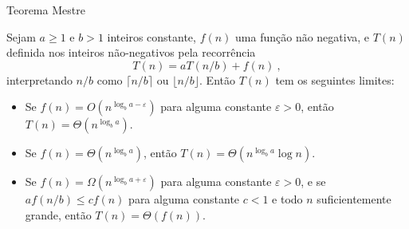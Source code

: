 \begin{frame}{Teorema Mestre}

    \begin{Theorem}
        Sejam $a \geq 1$ e $b > 1$ inteiros constante, $f(n)$ uma função não negativa, e $T(n)$ definida nos inteiros não-negativos pela recorrência
            \[ T(n) = aT(n/b) + f(n) \ , \]
        interpretando $n/b$ como $\lceil n/b \rceil$ ou $\lfloor n/b \rfloor$. Então $T(n)$ tem os seguintes limites:
            \begin{itemize} \pause
                \item[(i)] Se $f(n) = O(n^{\log_b a - \varepsilon})$ para alguma constante $\varepsilon > 0$, então $T(n) = \Theta(n^{\log_b a})$. \pause
                
                \item[(ii)] Se $f(n) = \Theta(n^{\log_b a})$, então $T(n) = \Theta(n^{\log_b a} \log n)$. \pause

                \item[(iii)] Se $f(n) = \Omega(n^{\log_b a + \varepsilon})$ para alguma constante $\varepsilon > 0$, e se $af(n/b) \leq c f(n)$ para alguma constante $c < 1$ e todo $n$ suficientemente grande, então $T(n) = \Theta(f(n))$.
            \end{itemize}
    \end{Theorem}

    
\end{frame}